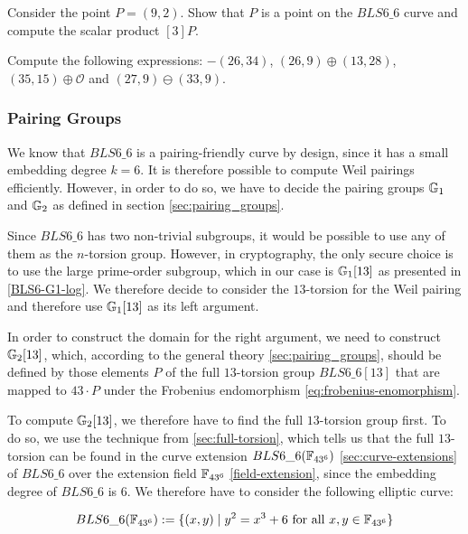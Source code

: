 \endgroup
\begin{exercise}
\label{ex:BLS66-scalar-product}
Consider the point $P=(9,2)$. Show that $P$ is a point on the $BLS6\_6$ curve and compute the scalar product $[3]P$. 
\end{exercise}
\begin{exercise}
Compute the following expressions: $-(26,34)$, $(26,9)\oplus(13,28)$, $(35,15)\oplus \mathcal{O}$ and $(27,9)\ominus(33,9)$.
\end{exercise}
\subsubsection{Pairing Groups}
\label{sec:bls66-pairing-groups}
We know that $BLS6\_6$ is a pairing-friendly curve by design, since it has a small embedding degree $k=6$. It is therefore possible to compute Weil pairings efficiently. However, in order to do so, we have to decide the pairing groups $\mathbb{G}_1$ and $\mathbb{G}_2$ as defined in section \ref{sec:pairing_groups}. 

Since $BLS6\_6$ has two non-trivial subgroups, it would be possible to use any of them as the $n$-torsion group. However, in cryptography, the only secure choice is to use the large prime-order subgroup, which in our case is $\mathbb{G}_1[13]$ as presented in \ref{BLS6-G1-log}. We therefore decide to consider the $13$-torsion for the Weil pairing and therefore use $\mathbb{G}_1[13]$ as its left argument.

In order to construct the domain for the right argument, we need to construct $\mathbb{G}_2[13]$, which, according to the general theory \ref{sec:pairing_groups}, should be defined by those elements $P$ of the full $13$-torsion group  $BLS6\_6[13]$ that are mapped to $43\cdot P$ under the Frobenius endomorphism \ref{eq:frobenius-enomorphism}. 

To compute $\mathbb{G}_2[13]$, we therefore have to find the full $13$-torsion group first. To do so, we use the technique from \ref{sec:full-torsion}, which tells us that the full $13$-torsion can be found in the curve extension $BLS6\_6(\mathbb{F}_{43^6})$ \ref{sec:curve-extensions} of $BLS6\_6$ over the extension field $\mathbb{F}_{43^6}$ \ref{field-extension}, since the embedding degree of $BLS6\_6$ is $6$. We therefore have to consider the following elliptic curve:

\begin{equation}
\label{def:extended-bls6}
BLS6\_6(\mathbb{F}_{43^6}) := \{(x,y)\;|\; y^2 = x^3 + 6 \text{ for all } x,y \in \mathbb{F}_{43^6}\}
\end{equation}

